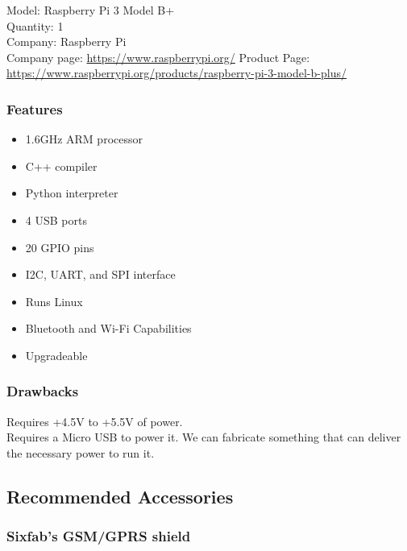 Model: Raspberry Pi 3 Model B+\\
Quantity: 1 \\
Company: Raspberry Pi \\
Company page: \href{https://www.raspberrypi.org/}{https://www.raspberrypi.org/}
Product Page:  \href{https://www.raspberrypi.org/products/raspberry-pi-3-model-b-plus/}{https://www.raspberrypi.org/products/raspberry-pi-3-model-b-plus/}

\subsubsection{Features}
\begin{itemize}
	\item 1.6GHz ARM processor
	\item C++ compiler
	\item Python interpreter
	\item 4 USB ports
	\item 20 GPIO pins
	\item I2C, UART, and SPI interface
	\item Runs Linux
	\item Bluetooth and Wi-Fi Capabilities
	\item Upgradeable
\end{itemize}

\subsubsection{Drawbacks}

Requires +4.5V to +5.5V of power.\\
Requires a Micro USB to power it. We can fabricate something that can deliver the necessary power to run it.

\subsection{Recommended Accessories}

\subsubsection{Sixfab’s GSM/GPRS shield}

